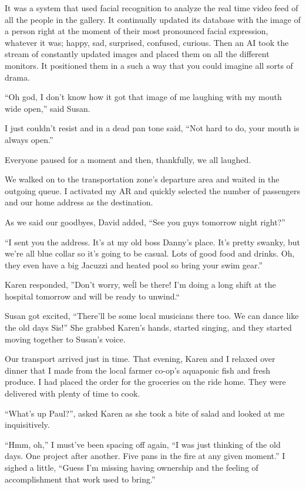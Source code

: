 It was a system that used facial recognition to analyze the real
time video feed of all the people in the gallery. It continually
updated its database with the image of a person right at the
moment of their most pronounced facial expression, whatever it
was; happy, sad, surprised, confused, curious. Then an AI took
the stream of constantly updated images and placed them on all
the different monitors. It positioned them in a such a way that
you could imagine all sorts of drama.

``Oh god, I don't know how it got that image of me
laughing with my mouth wide open,'' said Susan.

I just couldn't resist and in a dead pan tone said, ``Not hard
to do, your mouth is always open.''

Everyone paused for a moment and then, thankfully, we all
laughed.


We walked on to the transportation zone's departure area and
waited in the outgoing queue. I activated my AR and quickly
selected the number of passengers and our home address as the
destination.

As we said our goodbyes, David added, ``See you guys tomorrow
night right?''

``I sent you the address. It's at my old boss Danny's place.
It's pretty swanky, but we're all blue collar so it's going to be
casual. Lots of good food and drinks. Oh, they even have a big
Jacuzzi and heated pool so bring your swim gear.''

Karen responded, ''Don't worry, we\'ll be there! I'm doing a long
shift at the hospital tomorrow and will be ready to unwind.``

Susan got excited, ``There'll be some local musicians
there too. We can dance like the old days Sis!'' She
grabbed Karen's hands, started singing, and they started moving
together to Susan's voice.

Our transport arrived just in time.  That evening, Karen and I
relaxed over dinner that I made from the local farmer co-op's
aquaponic fish and fresh produce. I had placed the order for the
groceries on the ride home. They were delivered with plenty of
time to cook.

``What's up Paul?'', asked Karen as she took a bite of salad and
looked at me inquisitively.

``Hmm, oh,'' I must've been spacing off again, ``I was just
thinking of the old days. One project after another. Five pans
in the fire at any given moment.'' I sighed a little, ``Guess
I'm missing having ownership and the feeling of accomplishment
that work used to bring.''

